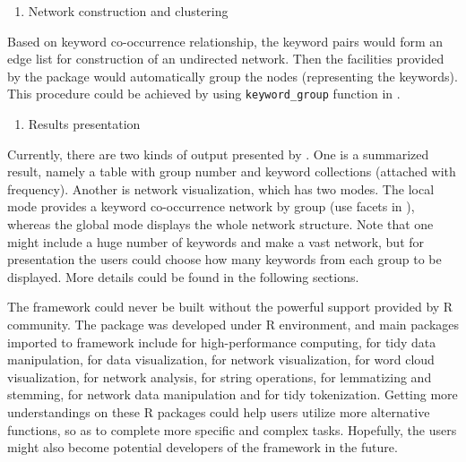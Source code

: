 \begin{enumerate}
\def\labelenumi{(\arabic{enumi})}
\setcounter{enumi}{2}
\tightlist
\item
  Network construction and clustering
\end{enumerate}

Based on keyword co-occurrence relationship, the keyword pairs would
form an edge list for construction of an undirected network. Then the
facilities provided by the  package would automatically
group the nodes (representing the keywords). This procedure could be
achieved by using \texttt{keyword\_group} function in .

\begin{enumerate}
\def\labelenumi{(\arabic{enumi})}
\setcounter{enumi}{3}
\tightlist
\item
  Results presentation
\end{enumerate}

Currently, there are two kinds of output presented by . One
is a summarized result, namely a table with group number and keyword
collections (attached with frequency). Another is network visualization,
which has two modes. The local mode provides a keyword co-occurrence
network by group (use facets in ), whereas the global
mode displays the whole network structure. Note that one might include a
huge number of keywords and make a vast network, but for presentation
the users could choose how many keywords from each group to be
displayed. More details could be found in the following sections.

The  framework could never be built without the powerful
support provided by R community. The  package was developed
under R environment, and main packages imported to 
framework include  \citep{dowle2021data} for
high-performance computing,  \citep{wickham2022dplyr} for
tidy data manipulation,  \citep{wickham2016ggplot2} for
data visualization,  \citep{pedersen2021ggraph} for
network visualization, 
\citep{pennec2019ggwordcloud} for word cloud visualization,
 \citep{csardi2006igraph} for network analysis,
 \citep{wickham2019stringr} for string operations,
 \citep{rinker2018textstem} for lemmatizing and
stemming,  \citep{pedersen2022tidygraph} for network
data manipulation and  \citep{silge2016tidytext} for
tidy tokenization. Getting more understandings on these R packages could
help users utilize more alternative functions, so as to complete more
specific and complex tasks. Hopefully, the users might also become
potential developers of the  framework in the future.


